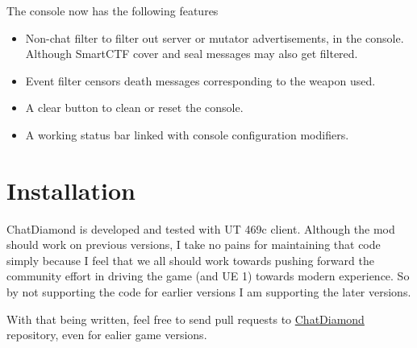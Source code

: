 \documentclass{article}
\begin{document}
The console now has the following features
\begin{itemize}
\item Non-chat filter to filter out server or mutator advertisements, in the console. Although SmartCTF cover and seal messages may also get filtered.
\item Event filter censors death messages corresponding to the weapon used.
\item A clear button to clean or reset the console.
\item A working status bar linked with console configuration modifiers.
\end{itemize}

\section{Installation}
ChatDiamond is developed and tested with UT 469c client.  Although the mod should work on previous versions, I take no pains for maintaining that code simply because I feel that we all should work towards pushing forward the community effort in driving the game (and UE 1) towards modern experience.  So by not supporting the code for earlier versions I am supporting the later versions.

With that being written, feel free to send pull requests to \href{https://github.com/ravimohan1991/ChatDiamond/}{ChatDiamond} repository, even for ealier game versions.
\end{document}
